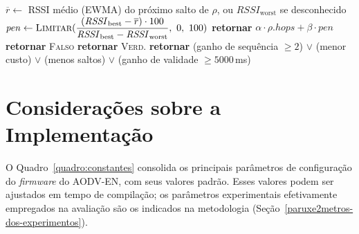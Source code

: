 \begin{algorithm}[H]
\caption{Custo da rota e critério de substituição}\label{alg:metrica}
\begin{algorithmic}[1]
  \State $\overline{r} \gets$ RSSI médio (EWMA) do próximo salto de $\rho$, ou $\mathit{RSSI}_{\mathrm{worst}}$ se desconhecido
  \State $\mathit{pen} \gets \Call{Limitar}{\dfrac{(\mathit{RSSI}_{\mathrm{best}} - \overline{r}) \cdot 100}{\mathit{RSSI}_{\mathrm{best}} - \mathit{RSSI}_{\mathrm{worst}}},\ 0,\ 100}$
  \State \textbf{retornar} $\alpha \cdot \rho.\mathit{hops} + \beta \cdot \mathit{pen}$
\EndFunction
\Statex
{}
  \quad \textbf{retornar} \textsc{Falso}\quad\EndIf
  \quad \textbf{retornar} \textsc{Verd.}\quad\EndIf
  \State \textbf{retornar} (ganho de sequência $\geq 2$) $\vee$ (menor custo) $\vee$ (menos saltos) $\vee$ (ganho de validade $\geq 5000$\,ms)
\EndFunction
\end{algorithmic}
\end{algorithm}

\section{Considerações sobre a Implementação}\label{consideracoes-sobre-a-implementacao}

O Quadro~\ref{quadro:constantes} consolida os principais parâmetros de
configuração do \emph{firmware} do AODV-EN, com seus valores padrão.
Esses valores podem ser ajustados em tempo de compilação; os parâmetros
experimentais efetivamente empregados na avaliação são os indicados na
metodologia (Seção~\ref{paruxe2metros-dos-experimentos}).

